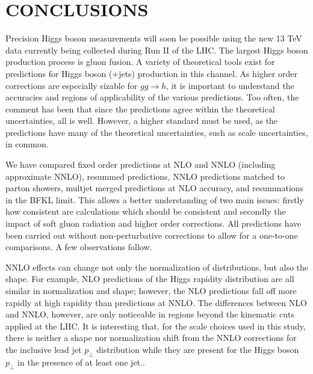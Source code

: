 \section{CONCLUSIONS}
\label{sec:hjetscomp:conclusions}

Precision Higgs boson measurements will soon be possible using the new
13 TeV data currently being collected during Run II of the LHC.
The largest Higgs boson production process is gluon fusion. A variety of theoretical 
tools exist for predictions for Higgs boson (+jets) production in this 
channel. As higher order corrections are especially sizable for $gg\to h$, 
it is important to understand the accuracies and regions of applicability 
of the various predictions. Too often, the comment has been that since 
the predictions agree within the theoretical uncertainties, all is well. 
However, a higher standard must be used, as the predictions have many of 
the theoretical uncertainties, such as scale uncertainties, in common. 

We have compared fixed order predictions at NLO and NNLO (including 
approximate NNLO), resummed predictions, NNLO predictions matched to parton 
showers, multjet merged predictions at NLO accuracy, and resummations 
in the BFKL limit. This allows a better understanding of two main issues: firstly how 
consistent are calculations which should be consistent and secondly the impact 
of soft gluon radiation and higher order corrections. All predictions have 
been carried out without non-perturbative corrections to allow for a one-to-one 
comparisons. A few observations follow. 

NNLO effects can change not only the normalization of distributions, but 
also the shape. For example, NLO predictions of the Higgs rapidity 
distribution are all similar in normalization and shape; however, the 
NLO predictions fall off more rapidly at high rapidity than predictions 
at NNLO. The differences between NLO and NNLO, however, are only 
noticeable in regions beyond the kinematic cuts applied at the LHC. It is 
interesting that, for the scale choices used in this study, there is 
neither a shape nor normalization shift from the NNLO corrections for the 
inclusive lead jet $p_\perp$ distribution while they are present for 
the Higgs boson $p_\perp$ in the presence of at least one jet.. 

